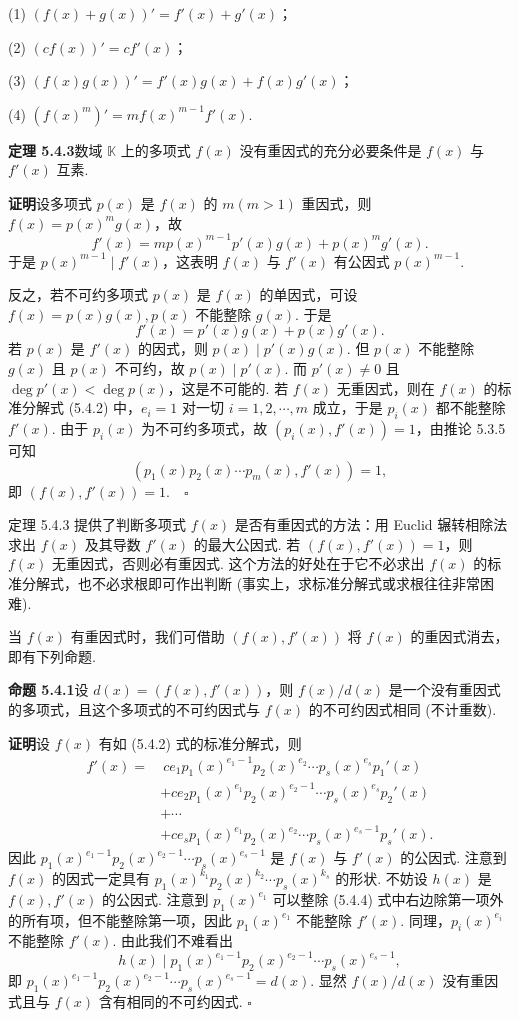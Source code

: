 \documentclass[UTF8, 12pt, fontset=fandol, oneside]{ctexart}
\begin{document}
(1) $(f(x)+g(x))'=f'(x)+g'(x)$；

(2) $(cf(x))'=cf'(x)$；

(3) $(f(x)g(x))'=f'(x)g(x)+f(x)g'(x)$；

(4) $(f(x)^m)'=mf(x)^{m-1}f'(x)$.

\noindent\textbf{定理 5.4.3}\quad 数域 $\mathbb{K}$ 上的多项式 $f(x)$ 没有重因式的充分必要条件是 $f(x)$ 与 $f'(x)$ 互素.

\noindent\textbf{证明}\quad 设多项式 $p(x)$ 是 $f(x)$ 的 $m(m>1)$ 重因式，则 $f(x)=p(x)^mg(x)$，故
\[
f'(x)=mp(x)^{m-1}p'(x)g(x)+p(x)^mg'(x).
\]
于是 $p(x)^{m-1}\mid f'(x)$，这表明 $f(x)$ 与 $f'(x)$ 有公因式 $p(x)^{m-1}$.

反之，若不可约多项式 $p(x)$ 是 $f(x)$ 的单因式，可设 $f(x)=p(x)g(x),p(x)$ 不能整除 $g(x)$. 于是
\[
f'(x)=p'(x)g(x)+p(x)g'(x).
\]
若 $p(x)$ 是 $f'(x)$ 的因式，则 $p(x)\mid p'(x)g(x)$. 但 $p(x)$ 不能整除 $g(x)$ 且 $p(x)$ 不可约，故 $p(x)\mid p'(x)$. 而 $p'(x)\neq 0$ 且 $\deg p'(x)<\deg p(x)$，这是不可能的. 若 $f(x)$ 无重因式，则在 $f(x)$ 的标准分解式 (5.4.2) 中，$e_i=1$ 对一切 $i=1,2,\cdots,m$ 成立，于是 $p_i(x)$ 都不能整除 $f'(x)$. 由于 $p_i(x)$ 为不可约多项式，故 $(p_i(x),f'(x))=1$，由推论 5.3.5 可知
\[
(p_1(x)p_2(x)\cdots p_m(x),f'(x))=1,
\]
即 $(f(x),f'(x))=1.\quad \square$

定理 5.4.3 提供了判断多项式 $f(x)$ 是否有重因式的方法：用 Euclid 辗转相除法求出 $f(x)$ 及其导数 $f'(x)$ 的最大公因式. 若 $(f(x),f'(x))=1$，则 $f(x)$ 无重因式，否则必有重因式. 这个方法的好处在于它不必求出 $f(x)$ 的标准分解式，也不必求根即可作出判断 (事实上，求标准分解式或求根往往非常困难).

当 $f(x)$ 有重因式时，我们可借助 $(f(x),f'(x))$ 将 $f(x)$ 的重因式消去，即有下列命题.

\noindent\textbf{命题 5.4.1}\quad 设 $d(x)=(f(x),f'(x))$，则 $f(x)/d(x)$ 是一个没有重因式的多项式，且这个多项式的不可约因式与 $f(x)$ 的不可约因式相同 (不计重数).

\noindent\textbf{证明}\quad 设 $f(x)$ 有如 (5.4.2) 式的标准分解式，则
\begin{equation}
\begin{aligned}
f'(x)=&\ ce_1p_1(x)^{e_1-1}p_2(x)^{e_2}\cdots p_s(x)^{e_s}p_1'(x)\\
&+ce_2p_1(x)^{e_1}p_2(x)^{e_2-1}\cdots p_s(x)^{e_s}p_2'(x)\\
&+\cdots\\
&+ce_sp_1(x)^{e_1}p_2(x)^{e_2}\cdots p_s(x)^{e_s-1}p_s'(x).
\end{aligned}
\tag{5.4.4}
\end{equation}
因此 $p_1(x)^{e_1-1}p_2(x)^{e_2-1}\cdots p_s(x)^{e_s-1}$ 是 $f(x)$ 与 $f'(x)$ 的公因式. 注意到 $f(x)$ 的因式一定具有 $p_1(x)^{k_1}p_2(x)^{k_2}\cdots p_s(x)^{k_s}$ 的形状. 不妨设 $h(x)$ 是 $f(x),f'(x)$ 的公因式. 注意到 $p_1(x)^{e_1}$ 可以整除 (5.4.4) 式中右边除第一项外的所有项，但不能整除第一项，因此 $p_1(x)^{e_1}$ 不能整除 $f'(x)$. 同理，$p_i(x)^{e_i}$ 不能整除 $f'(x)$. 由此我们不难看出
\[
h(x)\mid p_1(x)^{e_1-1}p_2(x)^{e_2-1}\cdots p_s(x)^{e_s-1},
\]
即 $p_1(x)^{e_1-1}p_2(x)^{e_2-1}\cdots p_s(x)^{e_s-1}=d(x)$. 显然 $f(x)/d(x)$ 没有重因式且与 $f(x)$ 含有相同的不可约因式. $\square$
\end{document}
